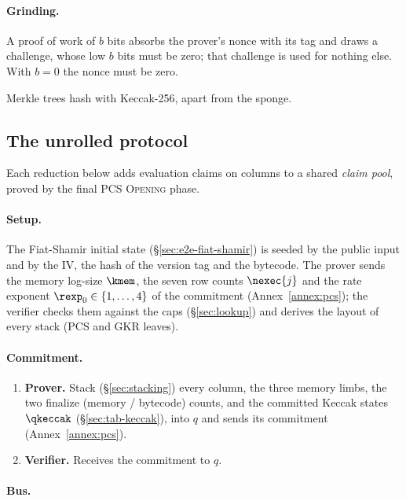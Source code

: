 \paragraph{Grinding.} A proof of work of $b$ bits absorbs the prover's nonce with its tag and draws a challenge, whose low $b$ bits must be zero; that challenge is used for nothing else. With $b=0$ the nonce must be zero.

Merkle trees hash with Keccak-256, apart from the sponge.

\subsection{The unrolled protocol}\label{sec:e2e-unrolled}

Each reduction below adds evaluation claims on columns to a shared \emph{claim pool}, proved by the final PCS \textsc{Opening} phase.

\paragraph{Setup.}


The Fiat-Shamir initial state (\S\ref{sec:e2e-fiat-shamir}) is seeded by the public input and by the IV, the hash of the version tag and the bytecode. The prover sends the memory log-size $\kmem$, the seven row counts $\nexec{j}$ and the rate exponent $\rexp_0\in\{1,\dots,4\}$ of the commitment (Annex~\ref{annex:pcs}); the verifier checks them against the caps (\S\ref{sec:lookup}) and derives the layout of every stack (PCS and GKR leaves).

\paragraph{Commitment.}

\begin{enumerate}
\item \textbf{Prover.} Stack (\S\ref{sec:stacking}) every column, the three memory limbs, the two finalize (memory / bytecode) counts, and the committed Keccak states $\qkeccak$ (\S\ref{sec:tab-keccak}), into $q$ and sends its commitment (Annex~\ref{annex:pcs}).
\item \textbf{Verifier.} Receives the commitment to $q$.
\end{enumerate}

\paragraph{Bus.}

